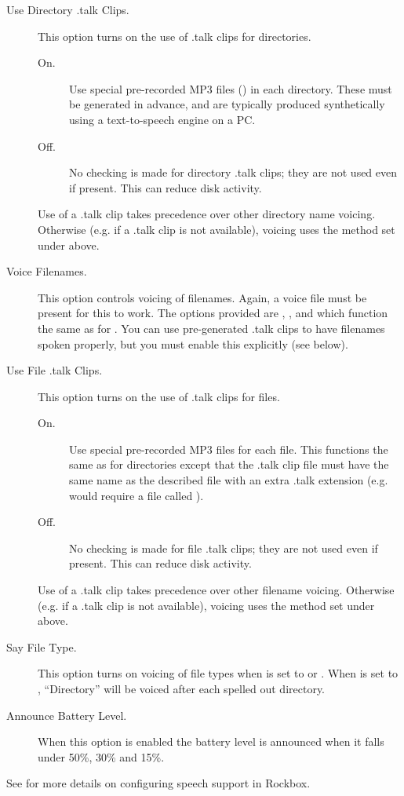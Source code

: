 \begin{description}
  \item[Use Directory .talk Clips.]
    This option turns on the use of .talk clips for directories. 
    \begin{description}
    \item[On.]
      Use special pre-recorded MP3 files () in each 
      directory. These must be generated in advance, and are typically 
      produced synthetically using a text-to-speech engine on a PC.
    \item[Off.]
      No checking is made for directory .talk clips; they are not used even if present.
      This can reduce disk activity.
    \end{description}
    Use of a .talk clip takes precedence over other directory name voicing. Otherwise 
    (e.g. if a .talk clip is not available), voicing uses the method set under 
     above.

  \item[Voice Filenames.]
    This option controls voicing of filenames. Again, a voice file must be present 
    for this to work. The options provided are , , 
    and  which function the same as for .
    You can use pre-generated .talk clips to have filenames spoken properly, but
    you must enable this explicitly (see below).

  \item[Use File .talk Clips.]
    This option turns on the use of .talk clips for files. 
    \begin{description}
    \item[On.]
      Use special pre-recorded MP3 files for each file.
      This functions the same as for directories except that the .talk clip file 
      must have the same name as the described file with an extra .talk extension 
      (e.g.  would require a file called ).
    \item[Off.]
      No checking is made for file .talk clips; they are not used even if present.
      This can reduce disk activity.
    \end{description}
    Use of a .talk clip takes precedence over other filename voicing. Otherwise 
    (e.g. if  a .talk clip is not available), voicing uses the method set under
      above.

  \item[Say File Type.]
    This option turns on voicing of file types when 
    is set to  or .
    When  is set to , ``Directory''
    will be voiced after each spelled out directory.

  \item[Announce Battery Level.]
    When this option is enabled the battery level is announced when it falls
    under 50\%, 30\% and 15\%.

  \end{description}

See  for more details on configuring speech support in Rockbox.
